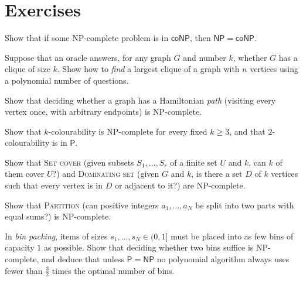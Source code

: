 \section{Exercises}

\begin{exercise}[$\star$]\label{ex:conpcomplete}
Show that if some NP-complete problem is in $\mathsf{coNP}$, then $\mathsf{NP}=\mathsf{coNP}$.
\end{exercise}

\begin{exercise}[$\star$]\label{ex:searchclique}
Suppose that an oracle answers, for any graph $G$ and number $k$, whether $G$ has a clique of size $k$. Show how to \emph{find} a largest clique of a graph with $n$ vertices using a polynomial number of questions.
\end{exercise}

\begin{exercise}[$\star$]\label{ex:hampath}
Show that deciding whether a graph has a Hamiltonian \emph{path} (visiting every vertex once, with arbitrary endpoints) is NP-complete.
\end{exercise}

\begin{exercise}[$\star$]\label{ex:kcol}
Show that $k$-colourability is NP-complete for every fixed $k\ge3$, and that $2$-colourability is in $\mathsf P$.
\end{exercise}

\begin{exercise}[$\star$]\label{ex:setcover}
Show that \textup{\textsc{Set cover}} (given subsets $S_1,\dots,S_r$ of a finite set $U$ and $k$, can $k$ of them cover $U$?) and \textup{\textsc{Dominating set}} (given $G$ and $k$, is there a set $D$ of $k$ vertices such that every vertex is in $D$ or adjacent to it?) are NP-complete.
\end{exercise}

\begin{exercise}[$\star\star$]\label{ex:partition}
Show that \textup{\textsc{Partition}} (can positive integers $a_1,\dots,a_N$ be split into two parts with equal sums?) is NP-complete.
\end{exercise}

\begin{exercise}[$\star\star$]\label{ex:binpacking}
In \emph{bin packing}, items of sizes $s_1,\dots,s_N\in(0,1]$ must be placed into as few bins of capacity $1$ as possible. Show that deciding whether two bins suffice is NP-complete, and deduce that unless $\mathsf P=\mathsf{NP}$ no polynomial algorithm always uses fewer than $\frac32$ times the optimal number of bins.
\end{exercise}

